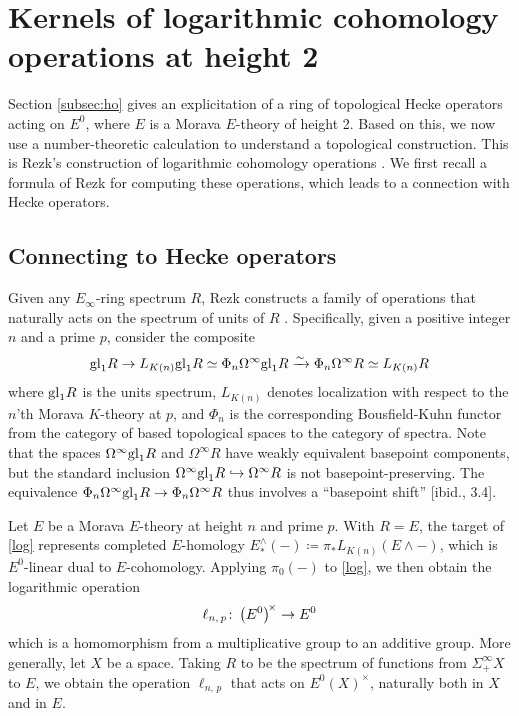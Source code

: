 \documentclass{gtpart}
\theoremstyle{definition}
\theoremstyle{remark}
\def\co{\colon\thinspace}
\newcommand{\ce}{\coloneqq}
\renewcommand{\=}{\approx}
\renewcommand{\-}{\sim}
\newcommand{\gl}{{\rm gl}}
\numberwithin{equation}{section}
\numberwithin{thm}{section}
\begin{document}
\section{Kernels of logarithmic cohomology operations at height 2}
\label{sec:kerlog}

Section \ref{subsec:ho} gives an explicitation of a ring of topological Hecke operators acting on $E^0$, where $E$ is a Morava $E$-theory of height 2.  
Based on this, we now use a number-theoretic calculation to understand a topological construction.  
This is Rezk's construction of logarithmic cohomology operations \cite{log}.  
We first recall a formula of Rezk for computing these operations, which leads to a connection with Hecke operators.  



\subsection{Connecting to Hecke operators}

Given any $E_\infty$-ring spectrum $R$, 
Rezk constructs a family of operations that naturally acts on the spectrum of units of $R$ \cite[Definition 3.6]{log}.  
Specifically, given a positive integer $n$ and a prime $p$, consider the composite 
\begin{equation}
 \label{log}
 \gl_1 R \to L_{K(n)} \gl_1 R \simeq \Phi_n \Omega^\infty \gl_1 R \xrightarrow{\sim} \Phi_n \Omega^\infty R \simeq L_{K(n)} R 
\end{equation}
where $\gl_1 R$ is the units spectrum, $L_{K(n)}$ denotes localization with respect to the $n$'th Morava $K$-theory at $p$, 
and $\Phi_n$ is the corresponding Bousfield-Kuhn functor from the category of based topological spaces to the category of spectra.  
Note that the spaces $\Omega^\infty \gl_1 R$ and $\Omega^\infty R$ have weakly equivalent basepoint components, 
but the standard inclusion $\Omega^\infty \gl_1 R \hookrightarrow \Omega^\infty R$ is not basepoint-preserving.  
The equivalence $\Phi_n \Omega^\infty \gl_1 R \to \Phi_n \Omega^\infty R$ thus involves a ``basepoint shift'' [ibid., 3.4].  

Let $E$ be a Morava $E$-theory at height $n$ and prime $p$.  
With $R = E$, the target of \eqref{log} represents completed $E$-homology 
$E^{\scriptscriptstyle \wedge}_*(-) \ce \pi_* L_{K(n)}(E \wedge -)$, 
which is $E^0$-linear dual to $E$-cohomology.  
Applying $\pi_0(-)$ to \eqref{log}, we then obtain the logarithmic operation 
\[
 \ell_{n,\,p} \co \big( E^0 \big)^{\!\times} \to E^0 
\]
which is a homomorphism from a multiplicative group to an additive group.  
More generally, let $X$ be a space.  Taking $R$ to be the spectrum of functions from $\Sigma^\infty_+ X$ to $E$, 
we obtain the operation $\ell_{n,\,p}$ that acts on $E^0(X)^\times$, naturally both in $X$ and in $E$.  
\end{document}
